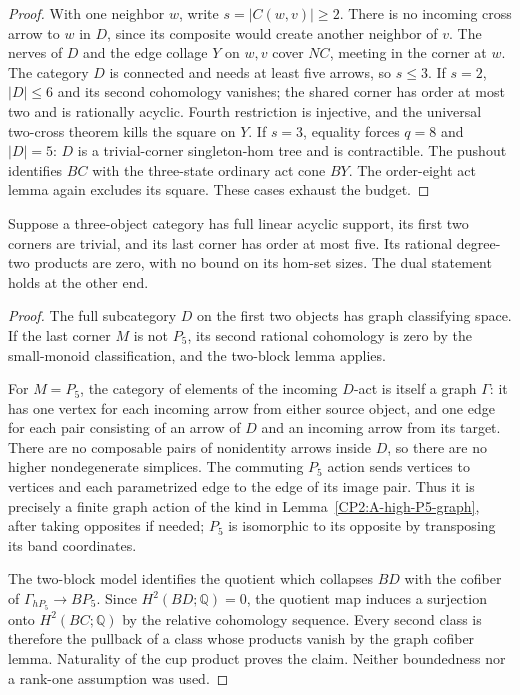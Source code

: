 \begin{proof}
With one neighbor $w$, write $s=|C(w,v)|\geq2$.
There is no incoming cross arrow to $w$ in $D$,
since its composite would create another neighbor
of $v$.  The nerves of $D$ and the edge collage
$Y$ on $w,v$ cover $NC$, meeting in the corner
at $w$.  The category $D$ is connected and needs
at least five arrows, so $s\leq3$.  If $s=2$,
$|D|\leq6$ and its second cohomology vanishes;
the shared corner has order at most two and is
rationally acyclic.  Fourth restriction is
injective, and the universal two-cross theorem
kills the square on $Y$.  If $s=3$, equality
forces $q=8$ and $|D|=5$: $D$ is a trivial-corner
singleton-hom tree and is contractible.  The
pushout identifies $BC$ with the three-state
ordinary act cone $BY$.  The order-eight act
lemma again excludes its square.  These cases
exhaust the budget.
\end{proof}

\begin{lemma}
\label{CP2:A-baseline-trivial-pair-five}
Suppose a three-object category has full linear acyclic support,
its first two corners are trivial, and its last corner has
order at most five.  Its rational degree-two products are
zero, with no bound on its hom-set sizes.  The dual statement
holds at the other end.
\end{lemma}
\begin{proof}
The full subcategory $D$ on the first two objects has graph
classifying space.  If the last corner $M$ is not $P_5$,
its second rational cohomology is zero by the small-monoid
classification, and the two-block lemma applies.

For $M=P_5$, the category of elements of the incoming
$D$-act is itself a graph $\Gamma$: it has one vertex for
each incoming arrow from either source object, and one edge
for each pair consisting of an arrow of $D$ and an incoming
arrow from its target.  There are no composable pairs of
nonidentity arrows inside $D$, so there are no higher
nondegenerate simplices.  The commuting $P_5$ action sends
vertices to vertices and each parametrized edge to the edge
of its image pair.  Thus it is precisely a finite graph
action of the kind in Lemma~\ref{CP2:A-high-P5-graph},
after taking opposites if needed; $P_5$ is isomorphic to
its opposite by transposing its band coordinates.

The two-block model identifies the quotient which collapses
$BD$ with the cofiber of $\Gamma_{hP_5}\to BP_5$.
Since $H^2(BD;\mathbb Q)=0$, the quotient map induces a
surjection onto $H^2(BC;\mathbb Q)$ by the relative
cohomology sequence.  Every second class is therefore the
pullback of a class whose products vanish by the graph
cofiber lemma.  Naturality of the cup product proves the
claim.  Neither boundedness nor a rank-one assumption was
used.
\end{proof}

